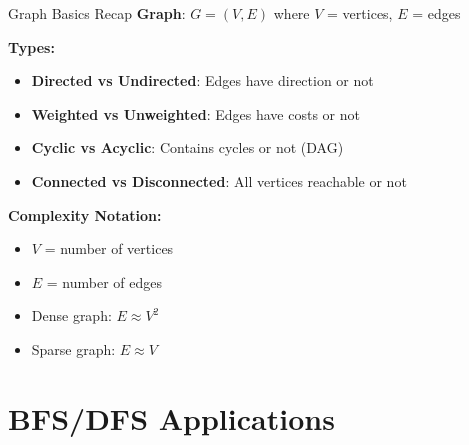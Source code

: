 \documentclass[aspectratio=169]{beamer}
\begin{document}
\begin{frame}{Graph Basics Recap}
  \textbf{Graph}: $G = (V, E)$ where $V$ = vertices, $E$ = edges

  \vspace{0.3cm}
  \textbf{Types:}
  \begin{itemize}
    \item \textbf{Directed vs Undirected}: Edges have direction or not
    \item \textbf{Weighted vs Unweighted}: Edges have costs or not
    \item \textbf{Cyclic vs Acyclic}: Contains cycles or not (DAG)
    \item \textbf{Connected vs Disconnected}: All vertices reachable or not
  \end{itemize}

  \vspace{0.3cm}
  \textbf{Complexity Notation:}
  \begin{itemize}
    \item $V$ = number of vertices
    \item $E$ = number of edges
    \item Dense graph: $E \approx V^2$
    \item Sparse graph: $E \approx V$
  \end{itemize}
\end{frame}

\section{BFS/DFS Applications}
\end{document}

